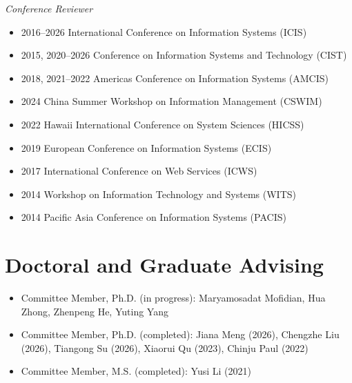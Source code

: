 \documentclass[paper=letter,fontsize=10pt]{scrartcl} %
\newcommand{\NewPart}[2]{\section*{{#1} #2}}
\begin{document}
\noindent\textit{Conference Reviewer}
\begin{itemize}
\item 2016--2026 \hspace{0.3em} International Conference on Information Systems (ICIS)
\item 2015, 2020--2026 \hspace{0.3em} Conference on Information Systems and Technology (CIST)
\item 2018, 2021--2022 \hspace{0.3em} Americas Conference on Information Systems (AMCIS)
\item 2024 \hspace{0.3em} China Summer Workshop on Information Management (CSWIM)
\item 2022 \hspace{0.3em} Hawaii International Conference on System Sciences (HICSS)
\item 2019 \hspace{0.3em} European Conference on Information Systems (ECIS)
\item 2017 \hspace{0.3em} International Conference on Web Services (ICWS)
\item 2014 \hspace{0.3em} Workshop on Information Technology and Systems (WITS)
\item 2014 \hspace{0.3em} Pacific Asia Conference on Information Systems (PACIS)
\end{itemize}



\NewPart{Doctoral and Graduate Advising}{}
\begin{itemize}
\item Committee Member, Ph.D. (in progress): Maryamosadat Mofidian, Hua Zhong, Zhenpeng He, Yuting Yang
\item Committee Member, Ph.D. (completed): Jiana Meng (2026), Chengzhe Liu (2026), Tiangong Su (2026), Xiaorui Qu (2023), Chinju Paul (2022)
\item Committee Member, M.S. (completed): Yusi Li (2021)
\end{itemize}

\end{document}
